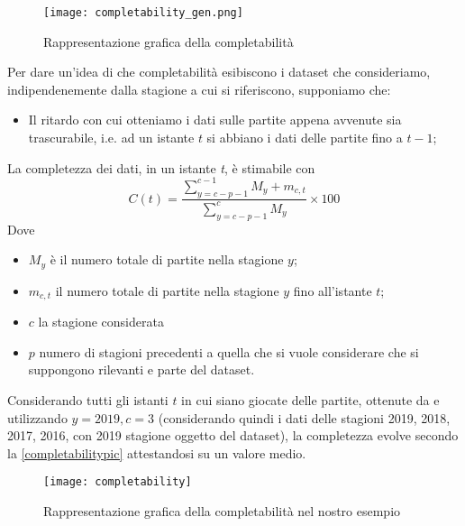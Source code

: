 \begin{figure}
\caption{Rappresentazione grafica della completabilità \cite{batini2006}}
\label{completabilitypic_gen}
\texttt{[image: completability\_gen.png]}
\end{figure}

\par

Per dare un'idea di che completabilità esibiscono i dataset che consideriamo, indipendenemente dalla stagione a cui si riferiscono, supponiamo che:


\begin{itemize}
	\item Il ritardo con cui otteniamo i dati sulle partite appena avvenute sia trascurabile, i.e. ad un istante $t$ si abbiano i dati delle partite fino a $t-1$;
\end{itemize}
	La completezza dei dati, in un istante \textit{t}, è stimabile con 
	\begin{equation}
	C(t) = \frac{\sum\limits_{y=c-p-1}^{c-1} M_{y} + m_{c,t}}{\sum\limits_{y=c-p-1}^{c} M_{y}} \times 100
	\end{equation}
	Dove \begin{itemize}
		\item $M_y$ è il numero totale di partite nella stagione $y$;
		\item $m_{c,t}$ il numero totale di partite nella stagione $y$ fino all'istante $t$;
		\item $c$ la stagione considerata
		\item $p$ numero di stagioni precedenti a quella che si vuole considerare che si suppongono rilevanti e parte del dataset.
	\end{itemize}

Considerando tutti gli istanti $t$ in cui siano giocate delle partite, ottenute da \cite{nba_schedule} e utilizzando $y = 2019, c = 3$ (considerando quindi i dati delle stagioni 2019, 2018, 2017, 2016, con 2019 stagione oggetto del dataset), la completezza evolve secondo la \autoref{completabilitypic} attestandosi su un valore medio.

\begin{figure}
\caption{Rappresentazione grafica della completabilità nel nostro esempio}
\label{completabilitypic}
\texttt{[image: completability]}
\end{figure}